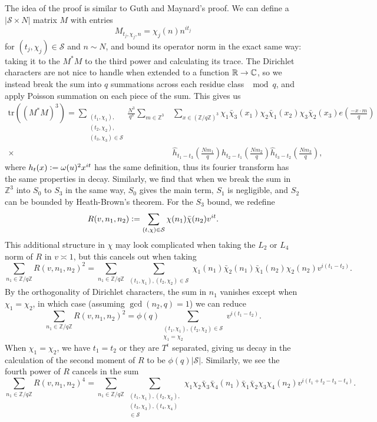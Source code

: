 The idea of the proof is similar to Guth and Maynard's proof. We can define a $|\mathcal{S}\times N|$ matrix $M$ with entries
\[
    M_{t_j,\chi_j,n} = \chi_j(n)n^{it_j}
\]
for $(t_j,\chi_j)\in\mathcal{S}$ and $n\sim N$, and bound its operator norm in the exact same way: taking it to the $M^*M$ to the third power and calculating its trace. The Dirichlet characters are not nice to handle when extended to a function $\mathbb{R} \to \mathbb{C}$, so we instead break the sum into $q$ summations across each residue class $\mod q$, and apply Poisson summation on each piece of the sum. This gives us \begin{align*}
    \textrm{tr}((M^*M)^3)=\sum_{\substack{(t_1,\chi_1),\\(t_2,\chi_2),\\(t_3,\chi_3)\in\mathcal{S}}}
    \frac{N^3}{q^3}\sum_{m\in\mathbb{Z}^3}&\sum_{x\in (\mathbb{Z}/q\mathbb{Z})^3}\chi_1\bar{\chi}_3(x_1)\chi_2\bar{\chi}_1(x_2)\chi_3\bar{\chi}_2(x_3) e\left(\frac{-x\cdot m}{q}\right)\\
    \times \ &\hat{h}_{t_1-t_3}\left(\frac{Nm_1}{q}\right)\hat{h}_{t_2-t_1}\left(\frac{Nm_2}{q}\right)\hat{h}_{t_3-t_2}\left(\frac{Nm_3}{q}\right),
\end{align*}
where $h_t(x) \mathrel{\mathop:}= \omega(u)^2 x^{it}$ has the same definition, thus its fourier transform has the same properties in decay. Similarly, we find that when we break the sum in $\mathbb{Z}^3$ into $S_0$ to $S_3$ in the same way, $S_0$ gives the main term, $S_1$ is negligible, and $S_2$ can be bounded by Heath-Brown's theorem. For the $S_3$ bound, we redefine \[
R(v,n_1,n_2)\mathrel{\mathop:}= \sum_{(t,\chi)\in\mathcal{S}}\chi(n_1)\bar{\chi}(n_2) v^{it}.
\]
This additional structure in $\chi$ may look complicated when taking the $L_2$ or $L_4$ norm of $R$ in $v\asymp 1$, but this cancels out when taking \[
\sum_{n_1\in\mathbb{Z}/q\mathbb{Z}} R(v,n_1,n_2)^2 = \sum_{n_1\in\mathbb{Z}/q\mathbb{Z}}\sum_{\substack{(t_1,\chi_1),(t_2,\chi_2)\in\mathcal{S}}}\chi_1(n_1)\bar\chi_2(n_1)\bar\chi_1(n_2)\chi_2(n_2) v^{i(t_1-t_2)}.
\]
By the orthogonality of Dirichlet characters, the sum in $n_1$ vanishes except when $\chi_1=\chi_2$, in which case (assuming $\gcd(n_2,q)=1$) we can reduce \[
    \sum_{n_1\in\mathbb{Z}/q\mathbb{Z}} R(v,n_1,n_2)^2 =\phi(q) \sum_{\substack{(t_1,\chi_1),(t_2,\chi_2)\in\mathcal{S}\\\chi_1=\chi_2}}v^{i(t_1-t_2)}.
\]
When $\chi_1=\chi_2$, we have $t_1=t_2$ or they are $T^\epsilon$ separated, giving us decay in the calculation of the second moment of $R$ to be $\phi(q)|\mathcal{S}|$.
Similarly, we see the fourth power of $R$ cancels in the sum \[
    \sum_{n_1\in\mathbb{Z}/q\mathbb{Z}} R(v,n_1,n_2)^4 = \sum_{n_1\in\mathbb{Z}/q\mathbb{Z}}\sum_{\substack{(t_1,\chi_1),(t_2,\chi_2),\\(t_3,\chi_3),(t_4,\chi_4)\\\in\mathcal{S}}}\chi_1\chi_2\bar\chi_3\bar\chi_4(n_1)\bar\chi_1\bar\chi_2\chi_3\chi_4(n_2) v^{i(t_1+t_2-t_3-t_4)}.
\]
